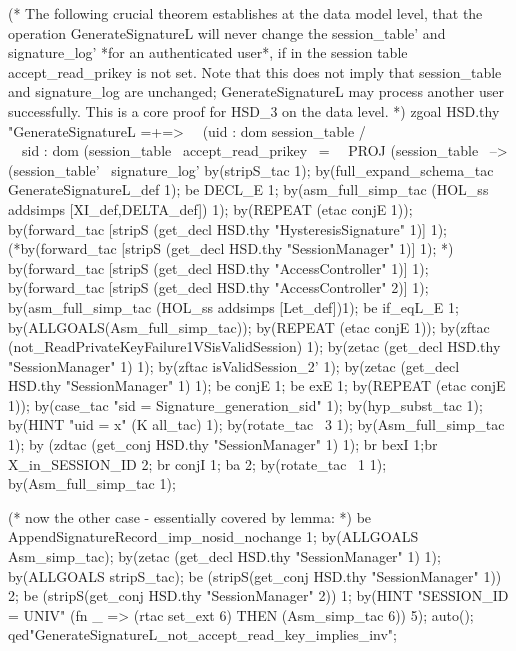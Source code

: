 \documentclass[a4paper,pdftex]{article}
\newenvironment{holz-proof}{\comment}{\endcomment}
\begin{document}
\begin{holz-proof}
(* The following crucial theorem establishes at the data model level,
   that the operation GenerateSignatureL will never change the 
   session_table' and signature_log' *for an authenticated user*,
   if in the session table accept_read_prikey is not set.
   Note that this does not imply that session_table and
   signature_log are unchanged; GenerateSignatureL may process
   another user successfully.
   This is a core proof for HSD_3 on the data level.
 *)
zgoal HSD.thy
"GenerateSignatureL =+=>                                              \
\ (uid : dom session_table /\\                                        \
\  sid : dom (session_table %
\  accept_read_prikey ~=                                              \
\   PROJ (session_table %
\ --> (session_table' %
\      signature_log' %
by(stripS_tac 1);
by(full_expand_schema_tac GenerateSignatureL_def 1);
be DECL_E 1;
by(asm_full_simp_tac (HOL_ss addsimps [XI_def,DELTA_def]) 1); 
by(REPEAT (etac conjE 1));
by(forward_tac [stripS (get_decl HSD.thy "HysteresisSignature" 1)] 1);
(*by(forward_tac [stripS (get_decl HSD.thy "SessionManager" 1)] 1); *)
by(forward_tac [stripS (get_decl HSD.thy "AccessController" 1)] 1);
by(forward_tac [stripS (get_decl HSD.thy "AccessController" 2)] 1);
by(asm_full_simp_tac (HOL_ss addsimps [Let_def])1);
be if_eqL_E 1;
by(ALLGOALS(Asm_full_simp_tac));
by(REPEAT (etac conjE 1));
by(zftac (not_ReadPrivateKeyFailure1VSisValidSession) 1);
by(zetac (get_decl HSD.thy "SessionManager" 1) 1);
by(zftac isValidSession_2' 1);
by(zetac (get_decl HSD.thy "SessionManager" 1) 1);
be conjE 1; be exE 1;
by(REPEAT (etac conjE 1));
by(case_tac "sid = Signature_generation_sid" 1);
   by(hyp_subst_tac 1);
   by(HINT "uid = x" (K all_tac) 1);
   by(rotate_tac ~3 1);
   by(Asm_full_simp_tac 1); 
   by (zdtac (get_conj HSD.thy "SessionManager" 1) 1);
   br bexI 1;br X_in_SESSION_ID 2;
   br conjI 1; ba 2;
   by(rotate_tac ~1 1);
   by(Asm_full_simp_tac 1);

(* now the other case - essentially covered by lemma: *)
be AppendSignatureRecord_imp_nosid_nochange 1;
by(ALLGOALS Asm_simp_tac);
by(zetac (get_decl HSD.thy "SessionManager" 1) 1);
by(ALLGOALS stripS_tac);
be (stripS(get_conj HSD.thy "SessionManager" 1)) 2;
be (stripS(get_conj HSD.thy "SessionManager" 2)) 1;
by(HINT "SESSION_ID = UNIV" (fn _ => (rtac set_ext 6) THEN (Asm_simp_tac 6)) 5);
auto();
qed"GenerateSignatureL_not_accept_read_key_implies_inv";





\end{holz-proof}
\end{document}
